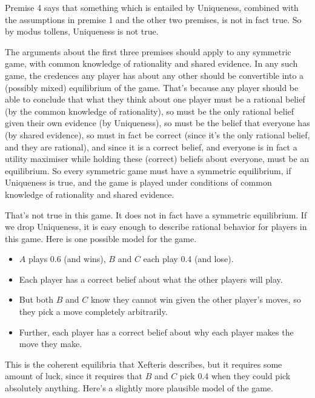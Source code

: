\documentclass[
  11pt,
]{article}
\providecommand{\tightlist}{%
  \setlength{\itemsep}{0pt}\setlength{\parskip}{0pt}}
\begin{document}
Premise 4 says that something which is entailed by Uniqueness, combined with the assumptions in premise 1 and the other two premises, is not in fact true. So by modus tollens, Uniqueness is not true.

The arguments about the first three premises should apply to any symmetric game, with common knowledge of rationality and shared evidence. In any such game, the credences any player has about any other should be convertible into a (possibly mixed) equilibrium of the game. That's because any player should be able to conclude that what they think about one player must be a rational belief (by the common knowledge of rationality), so must be the only rational belief given their own evidence (by Uniqueness), so must be the belief that everyone has (by shared evidence), so must in fact be correct (since it's the only rational belief, and they are rational), and since it is a correct belief, and everyone is in fact a utility maximiser while holding these (correct) beliefs about everyone, must be an equilibrium. So every symmetric game must have a symmetric equilibrium, if Uniqueness is true, and the game is played under conditions of common knowledge of rationality and shared evidence.

That's not true in this game. It does not in fact have a symmetric equilibrium. If we drop Uniqueness, it is easy enough to describe rational behavior for players in this game. Here is one possible model for the game.

\begin{itemize}
\tightlist
\item
  \(A\) plays 0.6 (and wins), \(B\) and \(C\) each play 0.4 (and lose).
\item
  Each player has a correct belief about what the other players will play.
\item
  But both \(B\) and \(C\) know they cannot win given the other player's moves, so they pick a move completely arbitrarily.
\item
  Further, each player has a correct belief about why each player makes the move they make.
\end{itemize}

This is the coherent equilibria that Xefteris describes, but it requires some amount of luck, since it requires that \(B\) and \(C\) pick 0.4 when they could pick absolutely anything. Here's a slightly more plausible model of the game.
\end{document}
